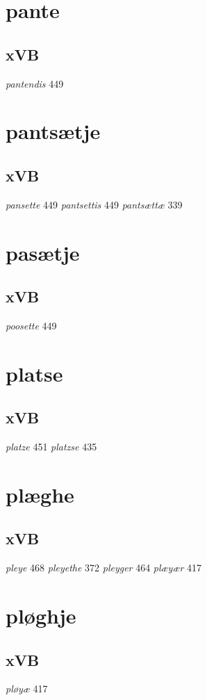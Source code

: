 \documentclass[a4paper,twocolumn]{article}
\begin{document}
\section{pante}
\label{sec:orgdcf511e}
\subsection{xVB}
\label{sec:org225d4bc}
\emph{pantendis} 449 
\section{pantsætje}
\label{sec:org6a91731}
\subsection{xVB}
\label{sec:orgf3946a1}
\emph{pansette} 449 \emph{pantsettis} 449 \emph{pantsættæ} 339 
\section{pasætje}
\label{sec:org44f6ddd}
\subsection{xVB}
\label{sec:orgc549d1d}
\emph{poosette} 449 
\section{platse}
\label{sec:org7ce17c6}
\subsection{xVB}
\label{sec:org1b3ecb4}
\emph{platze} 451 \emph{platzse} 435 
\section{plæghe}
\label{sec:orga616edc}
\subsection{xVB}
\label{sec:orgf1c79c1}
\emph{pleye} 468 \emph{pleyethe} 372 \emph{pleyger} 464 \emph{plæyær} 417 
\section{pløghje}
\label{sec:orgb223d54}
\subsection{xVB}
\label{sec:org77c8cba}
\emph{pløyæ} 417 
\end{document}
